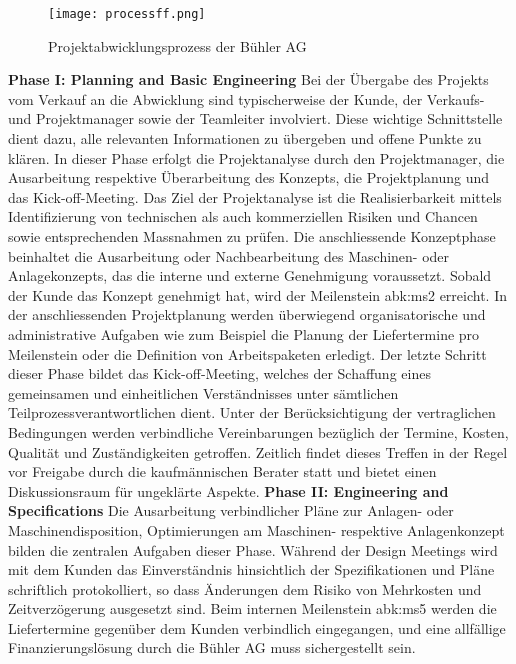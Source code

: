 \begin{figure}[H]
	\centering
	\texttt{[image: processff.png]}
	\caption{Projektabwicklungsprozess der Bühler AG}
	\label{fig: processff}
\end{figure}
\textbf{Phase I: Planning and Basic Engineering}
\newline
Bei der Übergabe des Projekts vom Verkauf an die Abwicklung sind typischerweise der Kunde, der Verkaufs- und Projektmanager sowie der Teamleiter involviert. Diese wichtige Schnittstelle dient dazu, alle relevanten Informationen zu übergeben und offene Punkte zu klären. In dieser Phase erfolgt die Projektanalyse durch den Projektmanager, die Ausarbeitung respektive Überarbeitung des Konzepts, die Projektplanung und das Kick-off-Meeting. Das Ziel der Projektanalyse ist die Realisierbarkeit mittels Identifizierung von technischen als auch kommerziellen Risiken und Chancen sowie entsprechenden Massnahmen zu prüfen. Die anschliessende Konzeptphase beinhaltet die Ausarbeitung oder Nachbearbeitung des Maschinen- oder Anlagekonzepts, das die interne und externe Genehmigung voraussetzt. Sobald der Kunde das Konzept genehmigt hat, wird der Meilenstein \gls{abk:ms2} erreicht. In der anschliessenden Projektplanung werden überwiegend organisatorische und administrative Aufgaben wie zum Beispiel die Planung der Liefertermine pro Meilenstein oder die Definition von Arbeitspaketen erledigt. Der letzte Schritt dieser Phase bildet das Kick-off-Meeting, welches der Schaffung eines gemeinsamen und einheitlichen Verständnisses unter sämtlichen Teilprozessverantwortlichen dient. Unter der Berücksichtigung der vertraglichen Bedingungen werden verbindliche Vereinbarungen bezüglich der Termine, Kosten, Qualität und Zuständigkeiten getroffen. Zeitlich findet dieses Treffen in der Regel vor Freigabe durch die kaufmännischen Berater statt und bietet einen Diskussionsraum für ungeklärte Aspekte.
\newline\newline
\textbf{Phase II: Engineering and Specifications}
\newline
Die Ausarbeitung verbindlicher Pläne zur Anlagen- oder Maschinendisposition, Optimierungen am Maschinen- respektive Anlagenkonzept bilden die zentralen Aufgaben dieser Phase. Während der Design Meetings wird mit dem Kunden das Einverständnis hinsichtlich der Spezifikationen und Pläne schriftlich protokolliert, so dass Änderungen dem Risiko von Mehrkosten und Zeitverzögerung ausgesetzt sind. Beim internen Meilenstein \gls{abk:ms5} werden die Liefertermine gegenüber dem Kunden verbindlich eingegangen, und eine allfällige Finanzierungslösung durch die Bühler AG muss sichergestellt sein.
